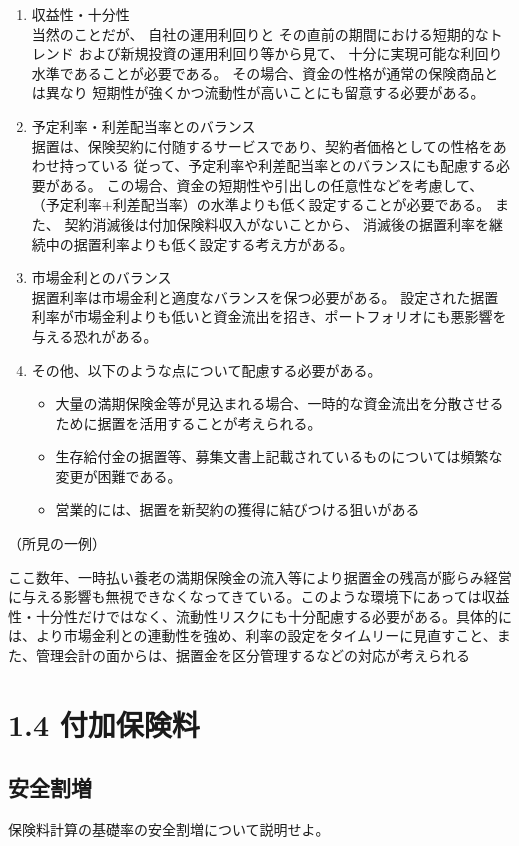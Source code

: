 \documentclass[report,gutter=10mm,fore-edge=10mm,uplatex,dvipdfmx]{jlreq}
\begin{document}
\begin{enumerate}
 \item  収益性・十分性\\
  当然のことだが、
自社の運用利回りと
その直前の期間における短期的なトレンド
および新規投資の運用利回り等から見て、
十分に実現可能な利回り水準であることが必要である。
その場合、資金の性格が通常の保険商品とは異なり
短期性が強くかつ流動性が高いことにも留意する必要がある。
 \item  予定利率・利差配当率とのバランス\\
	据置は、保険契約に付随するサービスであり、契約者価格としての性格をあわせ持っている
	従って、予定利率や利差配当率とのバランスにも配慮する必要がある。
	この場合、資金の短期性や引出しの任意性などを考慮して、
	（予定利率+利差配当率）の水準よりも低く設定することが必要である。
	また、 契約消滅後は付加保険料収入がないことから、
	消滅後の据置利率を継続中の据置利率よりも低く設定する考え方がある。
 \item  市場金利とのバランス\\
   据置利率は市場金利と適度なバランスを保つ必要がある。
   設定された据置利率が市場金利よりも低いと資金流出を招き、ポートフォリオにも悪影響を与える恐れがある。
 \item  その他、以下のような点について配慮する必要がある。
\begin{itemize}
 \item   大量の満期保険金等が見込まれる場合、一時的な資金流出を分散させるために据置を活用することが考えられる。
 \item  生存給付金の据置等、募集文書上記載されているものについては頻繁な変更が困難である。
 \item  営業的には、据置を新契約の獲得に結びつける狙いがある
\end{itemize}
\end{enumerate}

（所見の一例）

ここ数年、一時払い養老の満期保険金の流入等により据置金の残高が膨らみ経営に与える影響も無視できなくなってきている。このような環境下にあっては収益性・十分性だけではなく、流動性リスクにも十分配慮する必要がある。具体的には、より市場金利との連動性を強め、利率の設定をタイムリーに見直すこと、また、管理会計の面からは、据置金を区分管理するなどの対応が考えられる

\section{1.4 付加保険料}
\subsection{安全割増}
保険料計算の基礎率の安全割増について説明せよ。
\end{document}
